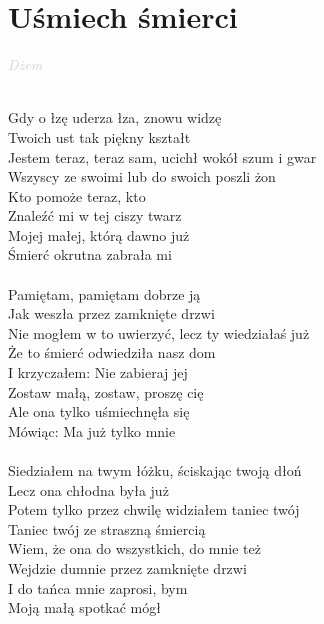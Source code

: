 \documentclass[a5paper, 10pt]{book}
\begin{document}
\section{Uśmiech śmierci}\textcolor{lightgray}{\textit{Dżem}}\\~\\
\begin{minipage}[t]{0.7\textwidth}
  Gdy o łzę uderza łza, znowu widzę\\
  Twoich ust tak piękny kształt\\
  Jestem teraz, teraz sam, ucichł wokół szum i gwar\\
  Wszyscy ze swoimi lub do swoich poszli żon\\
  \hspace*{4mm}Kto pomoże teraz, kto\\
  \hspace*{4mm}Znaleźć mi w tej ciszy twarz\\
  \hspace*{4mm}Mojej małej, którą dawno już\\
  \hspace*{4mm}Śmierć okrutna zabrała mi\\
  \\
  Pamiętam, pamiętam dobrze ją\\
  Jak weszła przez zamknięte drzwi\\
  Nie mogłem w to uwierzyć, lecz ty wiedziałaś już\\
  Że to śmierć odwiedziła nasz dom\\
  \hspace*{4mm}I krzyczałem: Nie zabieraj jej\\
  \hspace*{4mm}Zostaw małą, zostaw, proszę cię\\
  \hspace*{4mm}Ale ona tylko uśmiechnęła się\\
  \hspace*{4mm}Mówiąc: Ma już tylko mnie\\
  \\
  Siedziałem na twym łóżku, ściskając twoją dłoń\\
  Lecz ona chłodna była już\\
  Potem tylko przez chwilę widziałem taniec twój\\
  Taniec twój ze straszną śmiercią\\
  \hspace*{4mm}Wiem, że ona do wszystkich, do mnie też\\
  \hspace*{4mm}Wejdzie dumnie przez zamknięte drzwi\\
  \hspace*{4mm}I do tańca mnie zaprosi, bym\\
  \hspace*{4mm}Moją małą spotkać mógł\\
\end{minipage}
\end{document}
